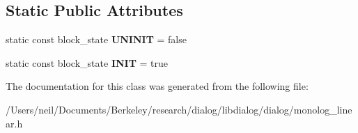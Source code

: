 \subsection*{Static Public Attributes}
\begin{DoxyCompactItemize}
\item 
\mbox{\label{classdialog_1_1monolog_1_1monolog__block_aa048117940af77eac669ff8e30354e03}} 
static const block\+\_\+state {\bfseries U\+N\+I\+N\+IT} = false
\item 
\mbox{\label{classdialog_1_1monolog_1_1monolog__block_a2fac8eeac6ee353ef1521dd9e69c8c63}} 
static const block\+\_\+state {\bfseries I\+N\+IT} = true
\end{DoxyCompactItemize}


The documentation for this class was generated from the following file\+:\begin{DoxyCompactItemize}
\item 
/\+Users/neil/\+Documents/\+Berkeley/research/dialog/libdialog/dialog/monolog\+\_\+linear.\+h\end{DoxyCompactItemize}
